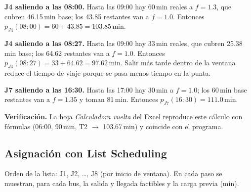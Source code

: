 \textbf{J4 saliendo a las 08:00.} Hasta las 09:00 hay 60\,min reales a $f = 1.3$, que cubren 46.15\,min base; los 43.85 restantes van a $f = 1.0$. Entonces $p_{J4}(08{:}00) = 60 + 43.85 = \mathbf{103.85}$\,min.

\textbf{J4 saliendo a las 08:27.} Hasta las 09:00 hay 33\,min reales, que cubren 25.38\,min base; los 64.62 restantes van a $f = 1.0$. Entonces $p_{J4}(08{:}27) = 33 + 64.62 = \mathbf{97.62}$\,min. Salir más tarde dentro de la ventana reduce el tiempo de viaje porque se pasa menos tiempo en la punta.

\textbf{J7 saliendo a las 16:30.} Hasta las 17:00 hay 30\,min a $f = 1.0$; los 60\,min base restantes van a $f = 1.35$ y toman 81\,min. Entonces $p_{J7}(16{:}30) = \mathbf{111.0}$\,min.

\begin{nota}
\textbf{\color{guinda}Verificación.} La hoja \emph{Calculadora vuelta} del Excel reproduce este cálculo con fórmulas (06:00, 90\,min, T2 $\to$ 103.67\,min) y coincide con el programa.
\end{nota}


\subsection{Asignación con List Scheduling}
Orden de la lista: J1, J2, \dots, J8 (por inicio de ventana). En cada paso se muestran, para cada bus, la salida y llegada factibles y la carga previa (min).

